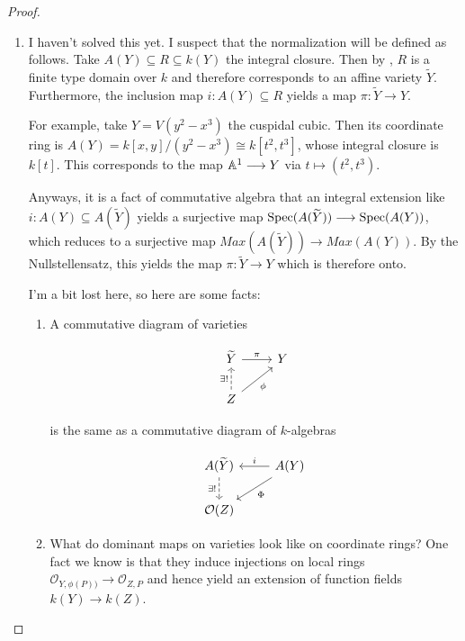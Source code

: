 \begin{proof}
\begin{enumerate}[label = (\alph*)]
        \item I haven't solved this yet. I suspect that the normalization will be defined as follows. Take $A(Y) \subseteq R \subseteq k(Y)$ the integral closure. Then by \cite[3.9A]{hartshorne}, $R$ is a finite type domain over $k$ and therefore corresponds to an affine variety $\widetilde{Y}$. Furthermore, the inclusion map $i: A(Y) \subseteq R$ yields a map $\pi: \widetilde Y \longrightarrow Y$.

        For example, take $Y = V(y^2 - x^3)$ the cuspidal cubic. Then its coordinate ring is $A(Y) = k[x, y]/(y^2 - x^3) \cong k[t^2, t^3]$, whose integral closure is $k[t]$. This corresponds to the map $\mathbb A^1 \longrightarrow Y$ via $t \mapsto (t^2, t^3)$.

        Anyways, it is a fact of commutative algebra that an integral extension like $i: A(Y) \subseteq A(\widetilde Y)$ yields a surjective map $\operatorname{Spec}(A(\widetilde Y)) \longrightarrow \operatorname{Spec}(A(Y))$, which reduces to a surjective map $Max(A(\widetilde Y)) \longrightarrow Max(A(Y))$. By the Nullstellensatz, this yields the map $\pi: \widetilde Y \longrightarrow Y$ which is therefore onto.

        I'm a bit lost here, so here are some facts:
        \begin{enumerate}[label=(\roman*)]
            \item A commutative diagram of varieties
            
            \[
                \begin{tikzcd}
                    \widetilde Y \arrow[r, "\pi"] & Y\\
                    Z \arrow[u, dashed, "\exists!"] \arrow[ur, "\phi", swap]
                \end{tikzcd}
            \]
            
            is the same as a commutative diagram of $k$-algebras

            \[
                \begin{tikzcd}
                    A(\widetilde Y) \arrow[d, dashed, "\exists!" swap] & A(Y) \arrow[l, "i", swap] \arrow[dl, "\Phi"]\\
                    \mathcal O(Z)
                \end{tikzcd}
            \]
            
            \item What do dominant maps on varieties look like on coordinate rings? One fact we know is that they induce injections on local rings $\mathcal O_{Y, \phi(P))} \longrightarrow \mathcal O_{Z, P}$ and hence yield an extension of function fields $k(Y) \longrightarrow k(Z)$.


\end{enumerate}
\end{enumerate}
\end{proof}
